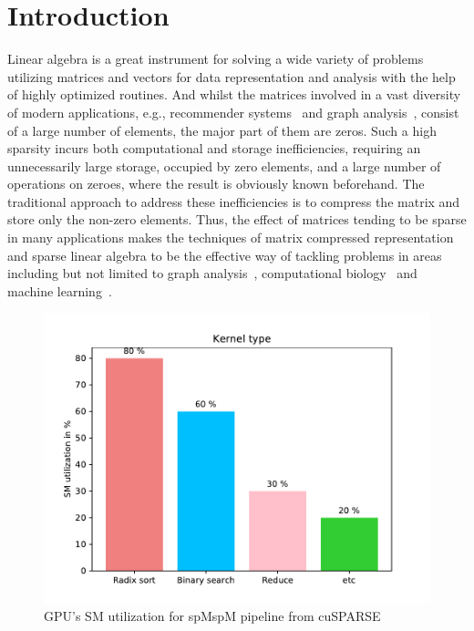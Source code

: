 \documentclass[10pt,conference]{IEEEtran}
\begin{document}
\section*{Introduction}
Linear algebra is a great instrument for solving a wide variety of problems utilizing matrices and vectors for data representation and analysis with the help of highly optimized routines.
And whilst the matrices involved in a vast diversity of modern applications, e.g., recommender systems~\cite{gupta2020architectural,amazon} and graph analysis~\cite{graph1,graph2}, consist of a large number of elements, the major part of them are zeros.
Such a high sparsity incurs both computational and storage inefficiencies, requiring an unnecessarily large storage, occupied by zero elements, and a large number of operations on zeroes, where the result is obviously known beforehand.
The traditional approach to address these inefficiencies is to compress the matrix and store only the non-zero elements. 
Thus, the effect of matrices tending to be sparse in many applications makes the techniques of matrix compressed representation and sparse linear algebra to be the effective way of tackling problems in areas including but not limited to graph analysis~\cite{GAILLA}, computational biology~\cite{compBio} and machine learning~\cite{Kepner_2017}.


\begin{figure}[t]
  \centering
  \includegraphics[width=\linewidth]{figs/SM_performance.pdf}
  \caption[Caption for LOF]{GPU's SM utilization for spMspM pipeline from cuSPARSE\footnotemark}
  \label{fig:sm_util}
\end{figure}
\end{document}
